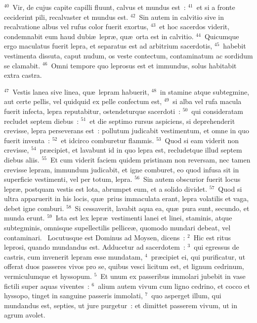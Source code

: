 ${}^{40}$~Vir, de cujus capite capilli fluunt, calvus et mundus est~:
${}^{41}$~et si a fronte ceciderint pili, recalvaster et mundus est.
${}^{42}$~Sin autem in calvitio sive in recalvatione albus vel rufus color fuerit exortus,
${}^{43}$~et hoc sacerdos viderit, condemnabit eum haud dubi\ae\ lepr\ae , qu\ae\ orta est in calvitio.
${}^{44}$~Quicumque ergo maculatus fuerit lepra, et separatus est ad arbitrium sacerdotis,
${}^{45}$~habebit vestimenta dissuta, caput nudum, os veste contectum, contaminatum ac sordidum se clamabit.
${}^{46}$~Omni tempore quo leprosus est et immundus, solus habitabit extra castra.


${}^{47}$~Vestis lanea sive linea, qu\ae\ lepram habuerit,
${}^{48}$~in stamine atque subtegmine, aut certe pellis, vel quidquid ex pelle confectum est,
${}^{49}$~si alba vel rufa macula fuerit infecta, lepra reputabitur, ostendeturque sacerdoti~:
${}^{50}$~qui consideratam recludet septem diebus~:
${}^{51}$~et die septimo rursus aspiciens, si deprehenderit crevisse, lepra perseverans est~: pollutum judicabit vestimentum, et omne in quo fuerit inventa~:
${}^{52}$~et idcirco comburetur flammis.
${}^{53}$~Quod si eam viderit non crevisse,
${}^{54}$~pr\ae cipiet, et lavabunt id in quo lepra est, recludetque illud septem diebus aliis.
${}^{55}$~Et cum viderit faciem quidem pristinam non reversam, nec tamen crevisse lepram, immundum judicabit, et igne comburet, eo quod infusa sit in superficie vestimenti, vel per totum, lepra.
${}^{56}$~Sin autem obscurior fuerit locus lepr\ae , postquam vestis est lota, abrumpet eum, et a solido dividet.
${}^{57}$~Quod si ultra apparuerit in his locis, qu\ae\ prius immaculata erant, lepra volatilis et vaga, debet igne comburi.
${}^{58}$~Si cessaverit, lavabit aqua ea, qu\ae\ pura sunt, secundo, et munda erunt.
${}^{59}$~Ista est lex lepr\ae\ vestimenti lanei et linei, staminis, atque subtegminis, omnisque supellectilis pellice\ae , quomodo mundari debeat, vel contaminari.
~Locutusque est Dominus ad Moysen, dicens~:
${}^{2}$~Hic est ritus leprosi, quando mundandus est. Adducetur ad sacerdotem~:
${}^{3}$~qui egressus de castris, cum invenerit lepram esse mundatam,
${}^{4}$~pr\ae cipiet ei, qui purificatur, ut offerat duos passeres vivos pro se, quibus vesci licitum est, et lignum cedrinum, vermiculumque et hyssopum.
${}^{5}$~Et unum ex passeribus immolari jubebit in vase fictili super aquas viventes~:
${}^{6}$~alium autem vivum cum ligno cedrino, et cocco et hyssopo, tinget in sanguine passeris immolati,
${}^{7}$~quo asperget illum, qui mundandus est, septies, ut jure purgetur~: et dimittet passerem vivum, ut in agrum avolet.
